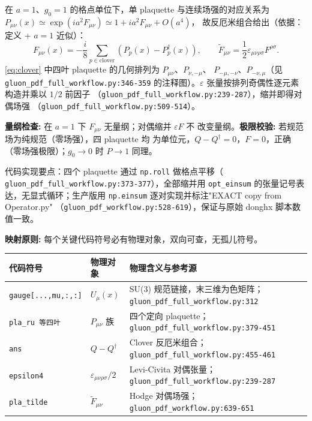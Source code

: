 \documentclass[UTF8]{ctexart}
\begin{document}
在 $a=1$、$g_0=1$ 的格点单位下，单 plaquette 与连续场强的对应关系为
$P_{\mu\nu}(x) \simeq \exp(i a^2 F_{\mu\nu}) \simeq 1 + i a^2 F_{\mu\nu} + O(a^4)$，
故反厄米组合给出（依据：定义 + $a=1$ 近似）：
\begin{equation}\label{eq:clover}
F_{\mu\nu}(x) = -\frac{i}{8}\sum_{p\in\text{clover}}\left(P_p(x) - P_p^\dagger(x)\right)
,\qquad
\tilde{F}_{\mu\nu} = \frac{1}{2}\varepsilon_{\mu\nu\rho\sigma}F^{\rho\sigma}.
\end{equation}
\eqref{eq:clover} 中四叶 plaquette 的几何排列为 $P_{\mu\nu}$、$P_{\nu,-\mu}$、
$P_{-\mu,-\nu}$、$P_{-\nu,\mu}$（见 \texttt{\nolinkurl{gluon\_pdf\_full\_workflow.py:346-359}}
的注释图）。$\varepsilon$ 张量按排列奇偶性逐元素构造并乘以 $1/2$ 前因子
（\texttt{\nolinkurl{gluon\_pdf\_full\_workflow.py:239-287}}），缩并即得对偶场强
（\texttt{\nolinkurl{gluon\_pdf\_full\_workflow.py:509-514}}）。

\textbf{量纲检查:} 在 $a=1$ 下 $F_{\mu\nu}$ 无量纲；对偶缩并 $\varepsilon F$ 不
改变量纲。\textbf{极限校验:} 若规范场为纯规范（零场强），四 plaquette 均
为单位元，$Q-Q^\dagger=0$，$F=0$，正确（零场强极限）；$g_0\to0$ 时
$P\to 1$ 同理。

代码实现要点：四个 plaquette 通过 \texttt{np.roll} 做格点平移（
\texttt{\nolinkurl{gluon\_pdf\_full\_workflow.py:373-377}}），全部缩并用
\texttt{opt\_einsum} 的张量记号表达，无显式循环；生产版用
\texttt{np.einsum} 逐对实现并标注"EXACT copy from Operator.py"
（\texttt{\nolinkurl{gluon\_pdf\_workflow.py:528-619}}），保证与原始 donghx 脚本数值一致。

\begin{mapbox}
\textbf{映射原则:} 每个关键代码符号必有物理对象，双向可查，无孤儿符号。
\end{mapbox}

\begin{xltabular}{\textwidth}{llX}
\toprule
\textcolor{map}{代码符号} & 物理对象 & 物理含义与参考源 \\
\midrule
\endhead
\texttt{gauge[...,mu,:,:]} & $U_\mu(x)$ & SU(3) 规范链接，末三维为色矩阵；\texttt{\nolinkurl{gluon_pdf_full_workflow.py:312}} \\
\texttt{pla\_ru 等四叶} & $P_{\mu\nu}$ 族 & 四个定向 plaquette；\texttt{\nolinkurl{gluon_pdf_full_workflow.py:379-451}} \\
\texttt{ans} & $Q-Q^\dagger$ & Clover 反厄米组合；\texttt{\nolinkurl{gluon_pdf_full_workflow.py:455-461}} \\
\texttt{epsilon4} & $\varepsilon_{\mu\nu\rho\sigma}/2$ & Levi-Civita 对偶张量；\texttt{\nolinkurl{gluon_pdf_full_workflow.py:239-287}} \\
\texttt{pla\_tilde} & $\tilde{F}_{\mu\nu}$ & Hodge 对偶场强；\texttt{\nolinkurl{gluon_pdf_workflow.py:639-651}} \\
\bottomrule
\end{xltabular}
\end{document}
